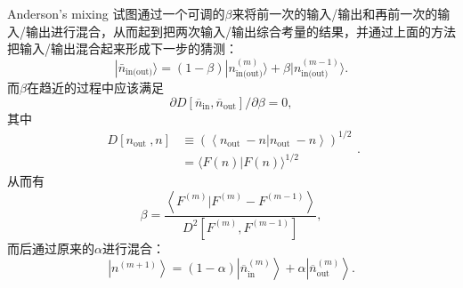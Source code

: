 \documentclass[12pt,a4paper,openany,twoside]{article}
\numberwithin{equation}{section}
\begin{document}
                Anderson's mixing 试图通过一个可调的$\beta$来将前一次的输入/输出和再前一次的输入/输出进行混合，从而起到把两次输入/输出综合考量的结果，并通过上面的方法把输入/输出混合起来形成下一步的猜测：
                \begin{equation}
                    |\bar{n}_\text{in(out)} \rangle = (1-\beta) |n_\text{in(out)}^{(m)} \rangle + \beta |n_\text{in(out)}^{(m-1)} \rangle.
                \end{equation}
                而$\beta$在趋近的过程中应该满足
                \begin{equation}
                    \partial D\left[\overline{n}_{\mathrm{in}}, \overline{n}_{\mathrm{out}}\right] / \partial \beta=0,
                \end{equation}
                其中
                \begin{equation}
                \begin{aligned} D\left[n_{\text {out }}, n\right] & \equiv\left(\left\langle n_{\text {out }}-n | n_{\text {out }}-n\right\rangle\right)^{1 / 2} \\ &=\langle F(n) | F(n)\rangle^{1 / 2} \end{aligned}.
                \end{equation}
                从而有
                \begin{equation}
                    \beta=\frac{\left\langle F^{(m)} | F^{(m)}-F^{(m-1)}\right\rangle}{D^{2}\left[F^{(m)}, F^{(m-1)}\right]},
                \end{equation}
                而后通过原来的$\alpha$进行混合：
                \begin{equation}
                    \left|n^{(m+1)}\right\rangle=(1-\alpha)\left|\overline{n}_{\text {in }}^{(m)}\right\rangle+\alpha\left|\overline{n}_{\text {out }}^{(m)}\right\rangle.
                \end{equation}
\end{document}
